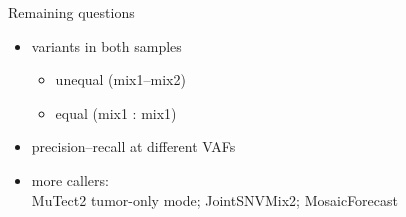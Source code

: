 \documentclass{beamer}
\begin{document}

\begin{frame}{Remaining questions}
\begin{itemize}
\item variants in both samples
\begin{itemize}
\item unequal (mix1--mix2)
\item equal (mix1 : mix1)
\end{itemize}
\item precision--recall at different VAFs
\item more callers:\\MuTect2 tumor-only mode; JointSNVMix2; MosaicForecast
\end{itemize}
\end{frame}
\end{document}
